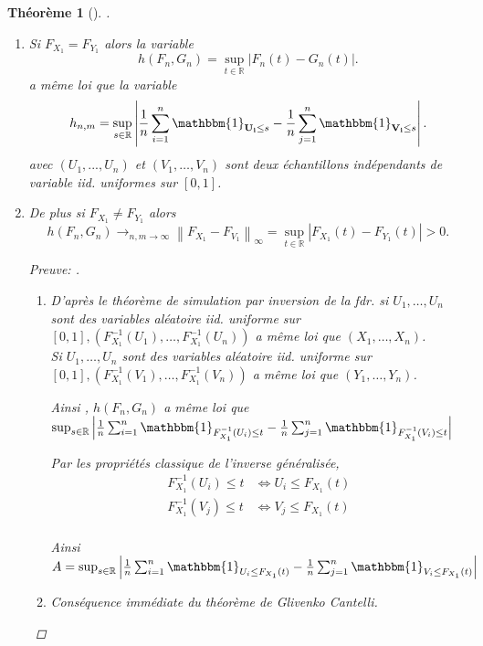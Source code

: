 \documentclass{article}
\theoremstyle{plain}%
\newtheorem{thm}{Théorème}[section]
\theoremstyle{definition}
\theoremstyle{remark}
\begin{document}
\begin{thm}[].
    \begin{enumerate}
        \item Si $ F_{X_1} = F_{Y_1} $ alors la variable 
        \[
            h(F_n, G_n) = \sup _{t \in \mathbb{R}} \left| F_n(t) - G_n(t) \right| 
        .\]
        a même loi que la variable 
        \[
            h_{n,m} = \sup _{s \in \mathbb{R}} \left| \frac{1}{n}\sum_{i=1}^{n} \mathbbm{1}_{\mathbf{U_i} \leq s} - \frac{1}{n}\sum_{j=1}^{n} \mathbbm{1}_{\mathbf{V_i} \leq s} \right| 
        .\]
        avec $ (U_1, ..., U_n) $ et $ (V_1, \dots, V_n) $ sont deux échantillons indépendants de variable iid. uniformes sur $ [0,1] $.
        \item De plus si $ F_{X_1} \neq F_{Y_1} $ alors 
        \[
            h(F_n, G_n) \to _{n,m \to \infty } \left\| F_{X_1} - F_{V_1} \right\|_{\infty } = \sup _{t \in \mathbb{R}} \left| F_{X_1}(t) - F_{Y_1}(t) \right| > 0
        .\]
        \begin{proof}[Preuve: ]
            \begin{enumerate}
                \item D'après le théorème de simulation par inversion de la fdr. si $ U_1, \dots, U_n $ sont des variables aléatoire iid. uniforme sur $ [0,1], (F_{X_1}^{-1}(U_1), \dots, F_{X_1}^{-1}(U_n))$ a même loi que $ (X_1, \dots, X_n) $. \\
                Si $ U_1, \dots, U_n $ sont des variables aléatoire iid. uniforme sur $ [0,1], (F_{X_1}^{-1}(V_1), \dots, F_{X_1}^{-1}(V_n))$ a même loi que $ (Y_1, \dots, Y_n) $.

                Ainsi , $ h(F_n, G_n) $ a même loi que $ \sup _{s \in \mathbb{R}} \left| \frac{1}{n}\sum_{i=1}^{n} \mathbbm{1}_{F_{X_1}^{-1}(U_i) \leq t} - \frac{1}{n}\sum_{j=1}^{n} \mathbbm{1}_{F_{X_1}^{-1}(V_i) \leq t} \right|$ 

                Par les propriétés classique de l'inverse généralisée,
                \begin{align*}
                    F_{X_1}^{-1} (U_i) \leq t &\Leftrightarrow U_i \leq F_{X_1} (t) \\
                    F_{X_1}^{-1} (V_j) \leq t &\Leftrightarrow V_j \leq F_{X_1}(t) \\
                \end{align*}

                Ainsi $ A = \sup _{s \in \mathbb{R}} \left| \frac{1}{n}\sum_{i=1}^{n} \mathbbm{1}_{U_i \leq F_{X_1}(t)} - \frac{1}{n}\sum_{j=1}^{n} \mathbbm{1}_{V_i \leq F_{X_1}(t)} \right|  $ 
                \item Conséquence immédiate du théorème de Glivenko Cantelli.
            \end{enumerate}
        \end{proof}
    \end{enumerate}
\end{thm}
\end{document}
